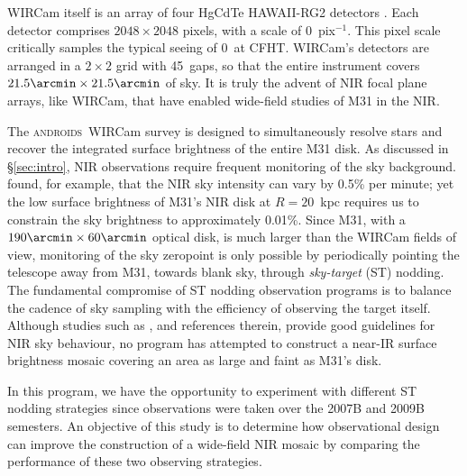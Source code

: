 \documentclass[iop]{emulateapj}
\newcommand{\androids}{\textsc{androids}}
\newcommand{\Sec}[1]{\S\ref{sec:#1}}  %
\begin{document}
WIRCam itself is an array of four HgCdTe HAWAII-RG2 detectors \citep{Puget:2004}.
Each detector comprises $2048\times 2048$ pixels, with a scale of 0~pix$^{-1}$.
This pixel scale critically samples the typical seeing of 0~at CFHT\@.
WIRCam's detectors are arranged in a $2\times 2$ grid with 45\arcsec~gaps, so that the entire instrument covers $21.5\arcmin \times 21.5\arcmin$ of sky.
It is truly the advent of NIR focal plane arrays, like WIRCam, that have enabled wide-field studies of M31 in the NIR.

The \androids\ WIRCam survey is designed to simultaneously resolve stars and recover the integrated surface brightness of the entire M31 disk.
As discussed in \Sec{intro}, NIR observations require frequent monitoring of the sky background.
\cite{Vaduvescu:2004} found, for example, that the NIR sky intensity can vary by 0.5\% per minute; yet the low surface brightness of M31's NIR disk at $R=20$~kpc requires us to constrain the sky brightness to approximately 0.01\%.
Since M31, with a $190\arcmin \times 60\arcmin$ optical disk, is much larger than the WIRCam fields of view, monitoring of the sky zeropoint is only possible by periodically pointing the telescope away from M31, towards blank sky, through \emph{sky-target} (ST) nodding. 
The fundamental compromise of ST nodding observation programs is to balance the cadence of sky sampling with the efficiency of observing the target itself.
Although studies such as \cite{Vaduvescu:2004}, and references therein, provide good guidelines for NIR sky behaviour, no program has attempted to construct a near-IR surface brightness mosaic covering an area as large and faint as M31's disk.

In this program, we have the opportunity to experiment with different ST nodding strategies since observations were taken over the 2007B and 2009B semesters.
An objective of this study is to determine how observational design can improve the construction of a wide-field NIR mosaic by comparing the performance of these two observing strategies.
\end{document}
